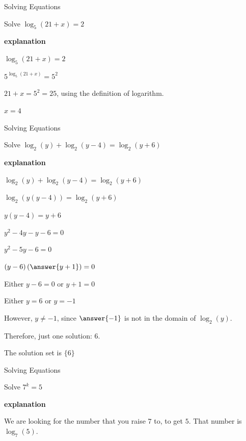 \documentclass{ximera}
\begin{document}
\begin{example} Solving Equations


Solve $\log_5(21 + x) = 2$


\textbf{\textcolor{red!75!green}{explanation}} 


$\log_5(21 + x) = 2$

$5^{\log_5(21 + x)} = 5^2$

$21 + x = 5^2 = 25$, using the definition of logarithm.

$x = 4$


\end{example}










\begin{example} Solving Equations


Solve $\log_2(y) + \log_2(y-4) = \log_2(y+6)$

\textbf{\textcolor{red!75!green}{explanation}} 


$\log_2(y) + \log_2(y-4) = \log_2(y+6)$

$\log_2(y(y-4)) = \log_2(y+6)$

$y(y-4) = y+6$    

$y^2 - 4y - y - 6 = 0$

$y^2 - 5y - 6 = 0$

$(y-6) \left( \answer{y+1} \right) = 0$


Either $y-6 = 0$ or $y+1 = 0$

Either $y = 6$ or $y = -1$

However, $y \ne -1$, since $\answer{-1}$ is not in the domain of $\log_2(y)$.

Therefore, just one solution: $6$.

The solution set is $\{ 6 \}$


\end{example}






\begin{example} Solving Equations


Solve $7^k = 5$


\textbf{\textcolor{red!75!green}{explanation}} 


We are looking for the number that you raise $7$ to, to get $5$.  That number  is $\log_7(5)$.


\end{example}
\end{document}
